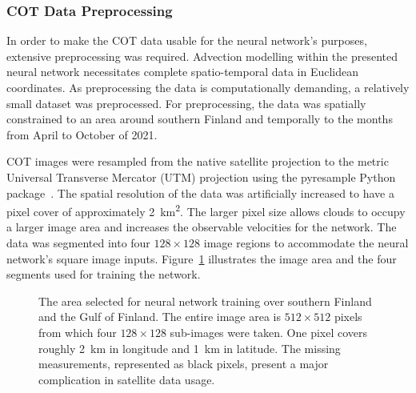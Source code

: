 \subsubsection{COT Data Preprocessing}\label{subsec:cotpreprocessing}
In order to make the COT data usable for the neural network's purposes, extensive preprocessing was required.
Advection modelling within the presented neural network necessitates complete spatio-temporal data in Euclidean coordinates.
As preprocessing the data is computationally demanding, a relatively small dataset was preprocessed.
For preprocessing, the data was spatially constrained to an area around southern Finland and temporally to the months from April to October of 2021.

COT images were resampled from the native satellite projection to the metric Universal Transverse Mercator (UTM) projection using the pyresample Python package~\cite{pyresample}.
The spatial resolution of the data was artificially increased to have a pixel cover of approximately \SI{2}{\kilo\metre\squared}.
The larger pixel size allows clouds to occupy a larger image area and increases the observable velocities for the network.
The data was segmented into four $128 \times 128$ image regions to accommodate the neural network's square image inputs.
Figure~\ref{fig:trainingdata_area} illustrates the image area and the four segments used for training the network.
\begin{figure}[H]
    \centering
    \caption{\label{fig:trainingdata_area}The area selected for neural network training over southern Finland and the Gulf of Finland.
    The entire image area is $512 \times 512$ pixels from which four $128 \times 128$ sub-images were taken.
    One pixel covers roughly \SI{2}{\kilo\metre} in longitude and \SI{1}{\kilo\metre} in latitude.
    The missing measurements, represented as black pixels, present a major complication in satellite data usage.}
\end{figure}

